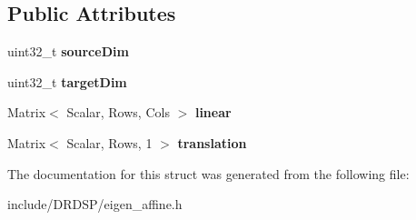 \subsection*{Public Attributes}
\begin{DoxyCompactItemize}
\item 
\hypertarget{struct_d_r_d_s_p_1_1_affine_a058d1d34ef0f0ec84d4eb164322000f5}{uint32\-\_\-t {\bfseries source\-Dim}}\label{struct_d_r_d_s_p_1_1_affine_a058d1d34ef0f0ec84d4eb164322000f5}

\item 
\hypertarget{struct_d_r_d_s_p_1_1_affine_a7db97fe01b7fa85b3b19d92f19e4f930}{uint32\-\_\-t {\bfseries target\-Dim}}\label{struct_d_r_d_s_p_1_1_affine_a7db97fe01b7fa85b3b19d92f19e4f930}

\item 
\hypertarget{struct_d_r_d_s_p_1_1_affine_a302f8c3a28cce92f9706d07c8bf1d0bd}{Matrix$<$ Scalar, Rows, Cols $>$ {\bfseries linear}}\label{struct_d_r_d_s_p_1_1_affine_a302f8c3a28cce92f9706d07c8bf1d0bd}

\item 
\hypertarget{struct_d_r_d_s_p_1_1_affine_a42856ff770f2fc78d3295752a3d2820f}{Matrix$<$ Scalar, Rows, 1 $>$ {\bfseries translation}}\label{struct_d_r_d_s_p_1_1_affine_a42856ff770f2fc78d3295752a3d2820f}

\end{DoxyCompactItemize}


The documentation for this struct was generated from the following file\-:\begin{DoxyCompactItemize}
\item 
include/\-D\-R\-D\-S\-P/eigen\-\_\-affine.\-h\end{DoxyCompactItemize}
